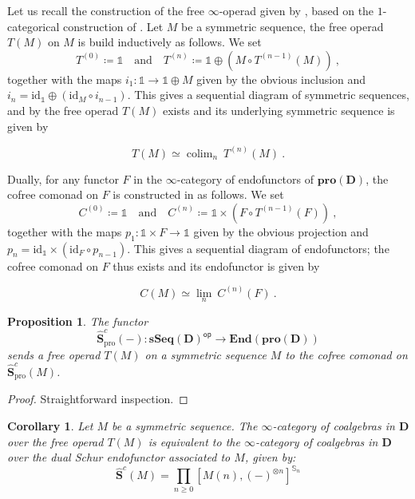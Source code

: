 \documentclass{proc-l}
\DeclareMathOperator*{\colim}{colim}
\theoremstyle{plain}
\newtheorem{proposition}[{theorem}]{Proposition}
\newtheorem{corollary}[{theorem}]{Corollary}
\theoremstyle{definition}
\theoremstyle{remark}
\begin{document}
Let us recall the construction of the free $\infty$-operad given by \cite[Appendix B]{pdalgebras}, based on the $1$-categorical construction of \cite{Kelly80}. Let $M$ be a symmetric sequence, the free operad $T(M)$ on $M$ is build inductively as follows. We set
\[
T^{(0)} \coloneqq \mathbb{1} \quad \text{and} \quad T^{(n)} \coloneqq \mathbb{1} \oplus \left(M \circ T^{(n-1)}(M)\right)~,
\]
together with the maps $i_1: \mathbb{1} \longrightarrow \mathbb{1} \oplus M$ given by the obvious inclusion and $i_n = \mathrm{id}_{\mathbb{1}} \oplus (\mathrm{id}_{M} \circ i_{n-1})$. This gives a sequential diagram of symmetric sequences, and by \cite[Theorem B.2]{pdalgebras} the free operad $T(M)$ exists and its underlying symmetric sequence is given by

\[
T(M) \simeq \colim_n ~ T^{(n)}(M)~.
\]
\vspace{0.1pc}

Dually, for any functor $F$ in the $\infty$-category of endofunctors of $\mathbf{pro}(\mathbf{D})$, the cofree comonad on $F$ is constructed in \cite[Appendix A.3]{heuts2024} as follows. We set
\[
C^{(0)} \coloneqq \mathbb{1} \quad \text{and} \quad C^{(n)} \coloneqq \mathbb{1} \times \left(F \circ T^{(n-1)}(F)\right)~,
\]
together with the maps $p_1: \mathbb{1} \times F \longrightarrow \mathbb{1}$ given by the obvious projection and $p_n = \mathrm{id}_{\mathbb{1}} \times (\mathrm{id}_{F} \circ p_{n-1})$. This gives a sequential diagram of endofunctors; the cofree comonad on $F$ thus exists and its endofunctor is given by

\[
C(M) \simeq \lim_n ~ C^{(n)}(F)~.
\]

\begin{proposition}%
\label{Proposition:3.14}\label{prop: sends free operad to cofree monad}
The functor
\[
\widehat{\mathbf{S}}^c_{\mathrm{pro}}(-): \mathbf{sSeq}(\mathbf{D})^{\mathsf{op}} \longrightarrow \mathbf{End}(\mathbf{pro}(\mathbf{D}))
\]
sends a free operad $T(M)$ on a symmetric sequence $M$ to the cofree comonad on $\widehat{\mathbf{S}}^c_{\mathrm{pro}}(M)$.
\end{proposition}

\begin{proof}
Straightforward inspection.
\end{proof}

\begin{corollary}%
\label{Corollary:3.15}\label{corollary: coalgebras over a free infinity operad}
Let $M$ be a symmetric sequence. The $\infty$-category of coalgebras in $\mathbf{D}$ over the free operad $T(M)$ is equivalent to the $\infty$-category of coalgebras in $\mathbf{D}$ over the dual Schur endofunctor associated to $M$, given by:
\[
\widehat{\mathbf{S}}^c(M) = \prod_{n \geq 0} \left[M(n),(-)^{\otimes n}\right]^{\mathbb{S}_n}
\]
\end{corollary}
\end{document}
